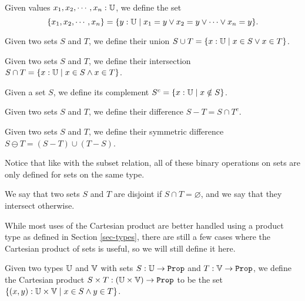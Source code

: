 \documentclass[../math.tex]{subfiles}
\begin{document}
\begin{definition}
    Given values $x_1, x_2, \cdots, x_n : \mathbb{U}$, we define the set
    \[
        \{x_1, x_2, \cdots, x_n\} =
        \{y : \mathbb{U} \mid x_1 = y \vee x_2 = y \vee \cdots \vee x_n = y\}.
    \]
\end{definition}

\begin{definition}
    Given two sets $S$ and $T$, we define their union $S \cup T = \{x : \mathbb{U} \mid
    x \in S \vee x \in T\}$.
\end{definition}

\begin{definition}
    Given two sets $S$ and $T$, we define their intersection $S \cap T = \{x :
    \mathbb{U} \mid x \in S \wedge x \in T\}$.
\end{definition}

\begin{definition}
    Given a set $S$, we define its complement $S^c = \{x : \mathbb{U} \mid x \notin
    S\}$.
\end{definition}

\begin{definition}
    Given two sets $S$ and $T$, we define their difference $S - T = S \cap T^c$.
\end{definition}

\begin{definition}
    Given two sets $S$ and $T$, we define their symmetric difference $S \ominus
    T = (S - T) \cup (T - S)$.
\end{definition}
\noindent Notice that like with the subset relation, all of these binary
operations on sets are only defined for sets on the same type.

\begin{definition}
    We say that two sets $S$ and $T$ are disjoint if $S \cap T = \varnothing$,
    and we say that they intersect otherwise.
\end{definition}

While most uses of the Cartesian product are better handled using a product type
as defined in Section \ref{sec-types}, there are still a few cases where the
Cartesian product of sets is useful, so we will still define it here.
\begin{definition}
    Given two types $\mathbb{U}$ and $\mathbb{V}$ with sets $S : \U \to \Prop$ and $T : \V \to
    \Prop$, we define the Cartesian product $S \times T : (\U \times \V) \to
    \Prop$ to be the set $\{(x, y) : \mathbb{U} \times \mathbb{V} \mid x \in S \wedge y \in
    T\}$.
\end{definition}
\end{document}
